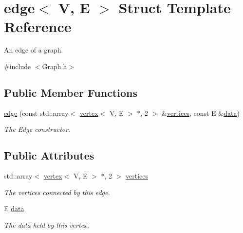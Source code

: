 \hypertarget{structedge}{\section{edge$<$ V, E $>$ Struct Template Reference}
\label{structedge}
}


An edge of a graph.  




{\ttfamily \#include $<$Graph.\+h$>$}

\subsection*{Public Member Functions}
\begin{DoxyCompactItemize}
\item 
\hyperlink{structedge_ad7ee290897d59993f6c36f1fe6017684}{edge} (const std\+::array$<$ \hyperlink{structvertex}{vertex}$<$ V, E $>$ $\ast$, 2 $>$ \&\hyperlink{structedge_abff4f32bae651d926d25e7462d932d69}{vertices}, const E \&\hyperlink{structedge_a1a619d3c9db678ad60811c4092b0dce9}{data})
\begin{DoxyCompactList}\small\item\em The Edge constructor. \end{DoxyCompactList}\end{DoxyCompactItemize}
\subsection*{Public Attributes}
\begin{DoxyCompactItemize}
\item 
\hypertarget{structedge_abff4f32bae651d926d25e7462d932d69}{std\+::array$<$ \hyperlink{structvertex}{vertex}$<$ V, E $>$ $\ast$, 2 $>$ \hyperlink{structedge_abff4f32bae651d926d25e7462d932d69}{vertices}}\label{structedge_abff4f32bae651d926d25e7462d932d69}

\begin{DoxyCompactList}\small\item\em The vertices connected by this edge. \end{DoxyCompactList}\item 
\hypertarget{structedge_a1a619d3c9db678ad60811c4092b0dce9}{E \hyperlink{structedge_a1a619d3c9db678ad60811c4092b0dce9}{data}}\label{structedge_a1a619d3c9db678ad60811c4092b0dce9}

\begin{DoxyCompactList}\small\item\em The data held by this vertex. \end{DoxyCompactList}\end{DoxyCompactItemize}


